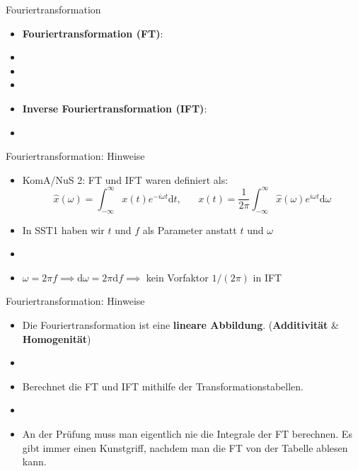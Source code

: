 \documentclass[14pt, aspectratio=169, handout]{beamer}
\begin{document}
\begin{frame}{Fouriertransformation}
    \begin{itemize}
    \item \textbf{Fouriertransformation (FT)}:
    \item[] %
    \item[] 
    \item[] 
    \item \textbf{Inverse Fouriertransformation (IFT)}:
    \item[] %
\end{itemize}
\end{frame}

\begin{frame}{Fouriertransformation: Hinweise}
    \begin{itemize}
        \item KomA/NuS 2: FT und IFT waren definiert als:
$$\hat{x}(\omega) = \int_{-\infty}^{\infty} x(t) e^{-i\omega t}\text{d}t, \hspace{20pt} x(t)=\frac{1}{2\pi} \int_{-\infty}^{\infty} \hat{x}(\omega)e^{i\omega t} \text{d}\omega$$
    \item In SST1 haben wir $t$ und $f$ als Parameter  anstatt $t$ und $\omega$
    \item[] 
    \item $\omega = 2\pi f \implies \text{d}\omega = 2\pi \text{d}f \implies$ kein Vorfaktor $1/(2\pi)$ in IFT
    \end{itemize}
\end{frame}

\begin{frame}{Fouriertransformation: Hinweise}
    \begin{itemize}
        \item Die Fouriertransformation ist eine \textbf{lineare Abbildung}. (\textbf{Additivität} \& \textbf{Homogenität})
        \item[] 
        \item \alert{Berechnet die FT und IFT mithilfe der Transformationstabellen.}
        \item[] 
        \item An der Prüfung muss man eigentlich nie die Integrale der FT berechnen. Es gibt immer einen Kunstgriff, nachdem man die FT von der Tabelle ablesen kann.
    \end{itemize}
\end{frame}
\end{document}
